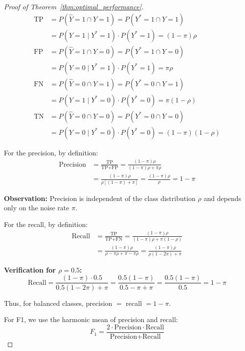 \documentclass{article}
\theoremstyle{plain}
\theoremstyle{definition}
\theoremstyle{remark}
\begin{document}
\begin{proof}[Proof of Theorem~\ref{thm:optimal_performance}]
\begin{align}
\text{TP} &= P(\hat{Y} = 1 \cap Y = 1) = P(Y^* = 1 \cap Y = 1) \nonumber \\
&= P(Y = 1 \mid Y^* = 1) \cdot P(Y^* = 1) = (1-\pi)\rho \\
\text{FP} &= P(\hat{Y} = 1 \cap Y = 0) = P(Y^* = 1 \cap Y = 0) \nonumber \\
&= P(Y = 0 \mid Y^* = 1) \cdot P(Y^* = 1) = \pi\rho \\
\text{FN} &= P(\hat{Y} = 0 \cap Y = 1) = P(Y^* = 0 \cap Y = 1) \nonumber \\
&= P(Y = 1 \mid Y^* = 0) \cdot P(Y^* = 0) = \pi(1-\rho) \\
\text{TN} &= P(\hat{Y} = 0 \cap Y = 0) = P(Y^* = 0 \cap Y = 0) \nonumber \\
&= P(Y = 0 \mid Y^* = 0) \cdot P(Y^* = 0) = (1-\pi)(1-\rho)
\end{align}

For the precision, by definition:
\begin{align}
\text{Precision} &= \frac{\text{TP}}{\text{TP} + \text{FP}} = \frac{(1-\pi)\rho}{(1-\pi)\rho + \pi\rho} \nonumber \\
&= \frac{(1-\pi)\rho}{\rho[(1-\pi) + \pi]} = \frac{(1-\pi)\rho}{\rho} = 1 - \pi
\end{align}

\textbf{Observation:} Precision is independent of the class distribution $\rho$ and depends only on the noise rate $\pi$.

For the recall, by definition:
\begin{align}
\text{Recall} &= \frac{\text{TP}}{\text{TP} + \text{FN}} = \frac{(1-\pi)\rho}{(1-\pi)\rho + \pi(1-\rho)} \nonumber \\
&= \frac{(1-\pi)\rho}{\rho - \pi\rho + \pi - \pi\rho} = \frac{(1-\pi)\rho}{\rho(1-2\pi) + \pi}
\end{align}

\textbf{Verification for $\rho = 0.5$:}
\begin{equation}
\text{Recall} = \frac{(1-\pi) \cdot 0.5}{0.5(1-2\pi) + \pi} = \frac{0.5(1-\pi)}{0.5 - \pi + \pi} = \frac{0.5(1-\pi)}{0.5} = 1 - \pi
\end{equation}

Thus, for balanced classes, precision $=$ recall $= 1-\pi$.

For F1, we use the harmonic mean of precision and recall:
\begin{equation}
F_1 = \frac{2 \cdot \text{Precision} \cdot \text{Recall}}{\text{Precision} + \text{Recall}}
\end{equation}


\end{proof}
\end{document}

